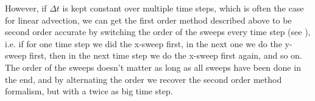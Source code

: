 However, if $\Delta t$ is kept constant over multiple time steps, which is
often the case for linear advection, we can get the first order method
described above to be second order accurate by switching the order of the
sweeps every time step (see \cite{leveque_2002}), i.e. if for one time step we
did the x-sweep first, in the next one we do the y-sweep first, then in the
next time step we do the x-sweep first again, and so on. The order of the
sweeps doesn't matter as long as all sweeps have been done in the end, and by
alternating the order we recover the second order method formalism, but with a
twice as big time step.




